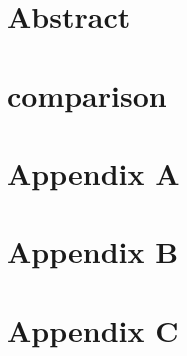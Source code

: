 




\maketitle
\vfill
\section{Abstract}
\newpage
\tableofcontents
\newpage


\newpage

\newpage


\newpage

\newpage

\newpage
\section{comparison}
\newpage
\section{Appendix A}
\newpage
\section{Appendix B}
\newpage
\section{Appendix C}
\newpage





